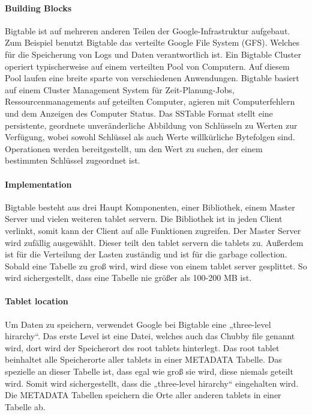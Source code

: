\paragraph{Building Blocks}
Bigtable ist auf mehreren anderen Teilen der Google-Infrastruktur aufgebaut. Zum Beispiel benutzt Bigtable das verteilte Google File System (GFS). Welches für die Speicherung von Logs und Daten verantwortlich ist. Ein Bigtable Cluster operiert typischerweise auf einem verteilten Pool von Computern. Auf diesem Pool laufen eine breite sparte von verschiedenen Anwendungen. Bigtable basiert auf einem Cluster Management System für Zeit-Planung-Jobs, Ressourcenmanagements auf geteilten Computer, agieren mit Computerfehlern und dem Anzeigen des Computer Status. Das SSTable Format stellt eine persistente, geordnete unveränderliche Abbildung von Schlüsseln zu Werten zur Verfügung, wobei sowohl Schlüssel als auch Werte willkürliche Bytefolgen sind. Operationen werden bereitgestellt, um den Wert zu suchen, der einem bestimmten Schlüssel zugeordnet ist.

\paragraph{Implementation}
Bigtable besteht aus drei Haupt Komponenten, einer Bibliothek, einem Master Server und vielen weiteren tablet servern. Die Bibliothek ist in jeden Client verlinkt, somit kann der Client auf alle Funktionen zugreifen. Der Master Server wird zufällig ausgewählt. Dieser teilt den tablet servern die tablets zu. Außerdem ist für die Verteilung der Lasten zuständig und ist für die garbage collection. Sobald eine Tabelle zu groß wird, wird diese von einem tablet server gesplittet. So wird sichergestellt, dass eine Tabelle nie größer als 100-200 MB ist.

\paragraph{Tablet location}
Um Daten zu speichern, verwendet Google bei Bigtable eine „three-level hirarchy“. Das erste Level ist eine Datei, welches auch das Chubby file genannt wird, dort wird der Speicherort des root tablets hinterlegt. Das root tablet beinhaltet alle Speicherorte aller tablets in einer METADATA Tabelle. Das spezielle an dieser Tabelle ist, dass egal wie groß sie wird, diese niemals geteilt wird. Somit wird sichergestellt, dass die „three-level hirarchy“ eingehalten wird. Die METADATA Tabellen speichern die Orte aller anderen tablets in einer Tabelle ab.

